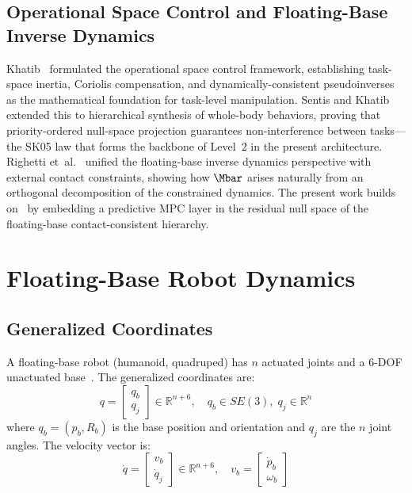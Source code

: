 \subsection{Operational Space Control and Floating-Base Inverse Dynamics}

Khatib~\cite{khatib1987unified} formulated the operational space control
framework, establishing task-space inertia, Coriolis compensation, and
dynamically-consistent pseudoinverses as the mathematical foundation for
task-level manipulation.
Sentis and Khatib~\cite{sentis2005synthesis} extended this to hierarchical
synthesis of whole-body behaviors, proving that priority-ordered null-space
projection guarantees non-interference between tasks---the SK05 law that
forms the backbone of Level~2 in the present architecture.
Righetti et~al.~\cite{righetti2011inverse} unified the floating-base
inverse dynamics perspective with external contact constraints, showing how
$\Mbar$ arises naturally from an orthogonal decomposition of the constrained
dynamics.
The present work builds on~\cite{khatib1987unified,sentis2005synthesis,righetti2011inverse}
by embedding a predictive MPC layer in the residual null space of the
floating-base contact-consistent hierarchy.

\section{Floating-Base Robot Dynamics}\label{sec:dynamics}

\subsection{Generalized Coordinates}

A floating-base robot (humanoid, quadruped) has $n$ actuated joints and a
6-DOF unactuated base~\cite{righetti2011inverse}. The generalized
coordinates are:
\begin{equation}\label{eq:gencoord}
  q = \begin{bmatrix} q_b \\ q_j \end{bmatrix} \in \mathbb{R}^{n+6},
  \quad q_b \in SE(3),\; q_j \in \mathbb{R}^n
\end{equation}
where $q_b=(p_b,R_b)$ is the base position and orientation and $q_j$ are
the $n$ joint angles. The velocity vector is:
\begin{equation}\label{eq:vel}
  \dot{q} = \begin{bmatrix} v_b \\ \dot{q}_j \end{bmatrix} \in \mathbb{R}^{n+6},
  \quad v_b = \begin{bmatrix} \dot{p}_b \\ \omega_b \end{bmatrix}
\end{equation}

